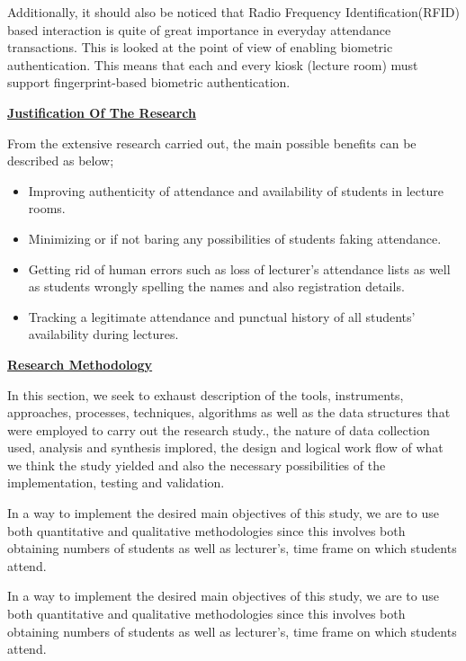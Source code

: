\documentclass[]{report}
\begin{document}
\begin{flushleft}
Additionally, it should also be noticed that Radio Frequency Identification(RFID) based interaction is quite of great importance in everyday attendance transactions. This is looked at the point of view of enabling biometric authentication. This means that each and every kiosk (lecture room) must support fingerprint-based biometric authentication.\linebreak

\underline{\textbf{Justification Of The Research}}\linebreak

From the extensive research carried out, the main possible benefits can be described as below;\begin{itemize}
	\item Improving authenticity of attendance and availability of students in lecture rooms.
	\item	Minimizing or if not baring any possibilities of students faking attendance.
	\item	Getting rid of human errors such as loss of lecturer’s attendance lists as well as students wrongly spelling the names and also registration details.
	\item	Tracking a legitimate attendance and punctual history of all students’ availability during lectures.
	
	
\end{itemize}

\underline{\textbf{Research Methodology}}\linebreak

In this section, we seek to exhaust description of the tools, instruments, approaches, processes, techniques, algorithms as well as the data structures that were employed to carry out the research study., the nature of data collection used, analysis and synthesis implored, the design and logical work flow of what we think the study yielded and also the necessary possibilities of the implementation, testing and validation.\linebreak

In a way to implement the desired main objectives of this study, we are to use both quantitative and qualitative methodologies since this involves both obtaining numbers of students as well as lecturer’s, time frame on which students attend.\linebreak

In a way to implement the desired main objectives of this study, we are to use both quantitative and qualitative methodologies since this involves both obtaining numbers of students as well as lecturer’s, time frame on which students attend.\linebreak


\end{flushleft}
\end{document}

